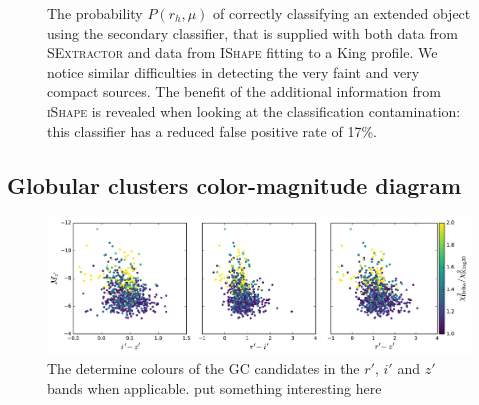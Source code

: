 \documentclass[useAMS,usenatbib]{mn2e}
\begin{document}
\begin{figure}
\begin{minipage}[t]{.49\textwidth}
		\caption{The probability $P(r_h, \mu)$ of correctly classifying an extended object using the secondary classifier, that is supplied with both data from \textsc{SExtractor} and data from \textsc{IShape} fitting to a King profile. We notice similar difficulties in detecting the very faint and very compact sources. The benefit of the additional information from \textsc{iShape} is revealed when looking at the classification contamination: this classifier has a reduced false positive rate of 17\%.}
		\label{fig:comp2}
	\end{minipage}
\end{figure}

%
%







\subsection{Globular clusters color-magnitude diagram}
\label{sec:gc_cmd}

\begin{figure}
	\includegraphics[width=\textwidth]{images/colour.pdf}
	\caption{The determine colours of the GC candidates in the $r'$, $i'$ and $z'$ bands when applicable.{\color{red} put something interesting here} }
	\label{fig:colour}
\end{figure}
\end{document}
